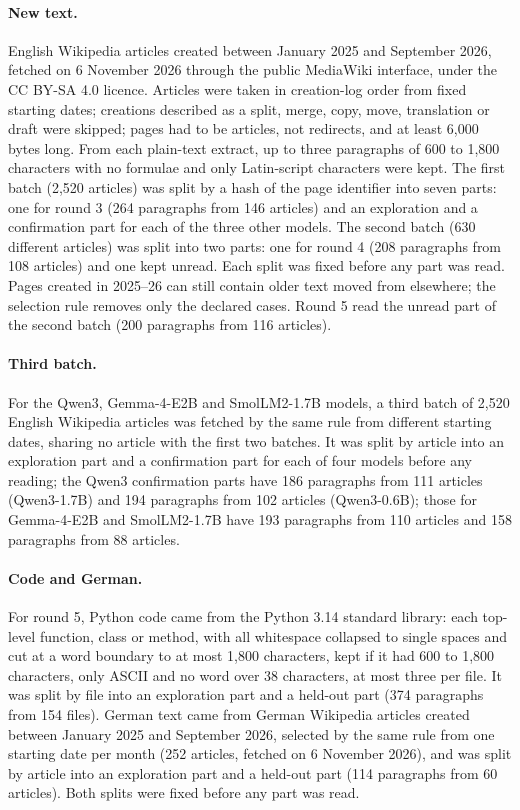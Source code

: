\documentclass[11pt,a4paper]{article}
\begin{document}
\paragraph{New text.}
English Wikipedia articles created between January 2025 and September 2026, fetched on 6 November 2026 through the public MediaWiki interface, under the CC BY-SA 4.0 licence. Articles were taken in creation-log order from fixed starting dates; creations described as a split, merge, copy, move, translation or draft were skipped; pages had to be articles, not redirects, and at least 6,000 bytes long. From each plain-text extract, up to three paragraphs of 600 to 1,800 characters with no formulae and only Latin-script characters were kept. The first batch (2,520 articles) was split by a hash of the page identifier into seven parts: one for round 3 (264 paragraphs from 146 articles) and an exploration and a confirmation part for each of the three other models. The second batch (630 different articles) was split into two parts: one for round 4 (208 paragraphs from 108 articles) and one kept unread. Each split was fixed before any part was read. Pages created in 2025--26 can still contain older text moved from elsewhere; the selection rule removes only the declared cases. Round 5 read the unread part of the second batch (200 paragraphs from 116 articles).

\paragraph{Third batch.}
For the Qwen3, Gemma-4-E2B and SmolLM2-1.7B models, a third batch of 2,520 English Wikipedia articles was fetched by the same rule from different starting dates, sharing no article with the first two batches. It was split by article into an exploration part and a confirmation part for each of four models before any reading; the Qwen3 confirmation parts have 186 paragraphs from 111 articles (Qwen3-1.7B) and 194 paragraphs from 102 articles (Qwen3-0.6B); those for Gemma-4-E2B and SmolLM2-1.7B have 193 paragraphs from 110 articles and 158 paragraphs from 88 articles.

\paragraph{Code and German.}
For round 5, Python code came from the Python 3.14 standard library: each top-level function, class or method, with all whitespace collapsed to single spaces and cut at a word boundary to at most 1,800 characters, kept if it had 600 to 1,800 characters, only ASCII and no word over 38 characters, at most three per file. It was split by file into an exploration part and a held-out part (374 paragraphs from 154 files). German text came from German Wikipedia articles created between January 2025 and September 2026, selected by the same rule from one starting date per month (252 articles, fetched on 6 November 2026), and was split by article into an exploration part and a held-out part (114 paragraphs from 60 articles). Both splits were fixed before any part was read.
\end{document}
